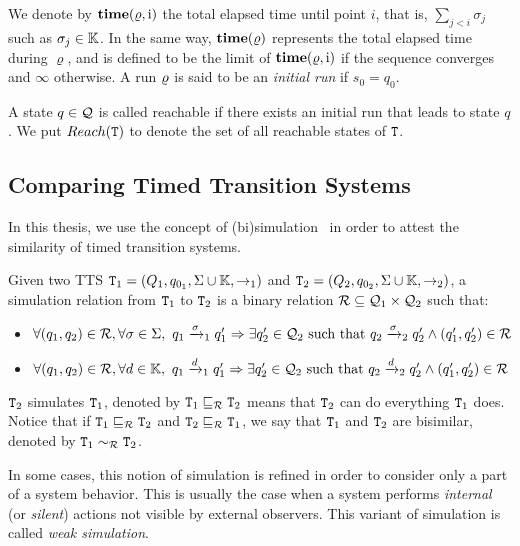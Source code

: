 We denote by $\mathbf{time(\varrho,\textnormal{i})}$ the total elapsed time until point $i$, that is,
$\sum_{j<i}\sigma_j$ such as $\sigma_j\in\mathbb{K}$. In the same way, $\mathbf{time(\varrho)}$ represents
the total elapsed time during $\varrho$, and is defined to be the limit of $\mathbf{time(\varrho,\textnormal{i})}$
if the sequence converges and $\infty$ otherwise.
A run $\varrho$ is said to be an \emph{initial run} if $s_0=q_0$. 

A state $q\in\mathcal{Q}$ is called reachable if there exists an initial run
that leads to state $q$. We put $Reach(\texttt{T})$ to denote the set of all 
reachable states of $\texttt{T}$.
\subsection{Comparing Timed Transition Systems}
In this thesis, we use the concept of (bi)simulation~\cite{bsim} 
in order to attest the similarity of timed transition systems.
\begin{definition}[Simulation]\label{def:sim}
  Given two TTS $\texttt{T}_{1}=(Q_{1},q_{0_{1}},\Sigma\cup\mathbb{K},\to_{1})$ and $\texttt{T}_{2}=(Q_{2},q_{0_{2}},\Sigma\cup\mathbb{K},\to_{2})$, a simulation relation from 
  $\texttt{T}_{1}$ to $\texttt{T}_{2}$ is a binary relation $\mathcal{R}\subseteq\mathcal{Q}_1
  \times\mathcal{Q}_2$ such that:
  \begin{itemize}
    \item $\forall(q_1,q_2)\in\mc{R},\forall\sigma\in\Sigma,\ 
      q_1\transitb{\sigma}{1}q_1'\Rightarrow\exists q'_2\in\mc{Q}_2 
      \text{ such that } q_2\transitb{\sigma}{2}q_2'\wedge
      (q_1',q_2')\in\mc{R}$
    \item $\forall(q_1,q_2)\in\mc{R},\forall d\in\mb{K},\ 
      q_1\transitb{d}{1}q_1'\Rightarrow\exists q'_2\in\mc{Q}_2 
      \text{ such that } q_2\transitb{d}{2}q_2'\wedge
      (q_1',q_2')\in\mc{R}$
  \end{itemize}
\end{definition}
  $\texttt{T}_{2}$ simulates $\texttt{T}_{1}$, denoted by $\texttt{T}_{1}\sqsubseteq_{\mathcal{R}}\texttt{T}_{2}$
  means that $\texttt{T}_{2}$ can do everything $\texttt{T}_{1}$ does. Notice that if
  $\texttt{T}_{1}\sqsubseteq_{\mathcal{R}}\texttt{T}_{2}$ and $\texttt{T}_{2}\sqsubseteq_{\mathcal{R}}\texttt{T}_{1}$,
  we say that $\texttt{T}_{1}$ and $\texttt{T}_{2}$ are bisimilar, denoted by
  $\texttt{T}_{1}\sim_{\mathcal{R}}\texttt{T}_{2}$.  

In some cases, this notion of simulation is refined in order to consider only
a part of a system behavior. This is usually the case when a system
performs \emph{internal} (or \emph{silent}) actions not visible by external
observers. This variant of simulation is called \emph{weak simulation}.

